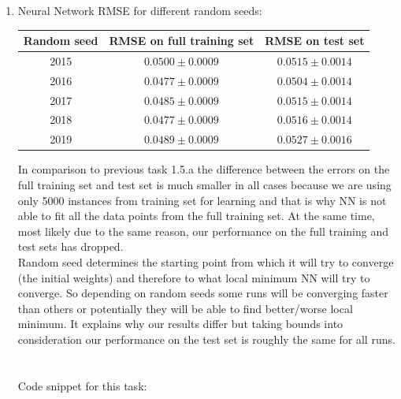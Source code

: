 \documentclass{article}
\begin{document}
\begin{enumerate}[label=(\alph*)]
				\item
					Neural Network RMSE for different random seeds:
					\begin{center}
						\begin{tabular}{| c | c | c |}
							\hline
							Random seed & RMSE on full training set & RMSE on test set\\ \hline
							2015 & $0.0500 \pm 0.0009$ & $0.0515 \pm 0.0014$ \\ 
							2016 & $0.0477 \pm 0.0009$ & $0.0504 \pm 0.0014$ \\ 
							2017 & $0.0485 \pm 0.0009$ & $0.0515 \pm 0.0014$ \\ 
							2018 & $0.0477 \pm 0.0009$ & $0.0516 \pm 0.0014$ \\ 
							2019 & $0.0489 \pm 0.0009$ & $0.0527 \pm 0.0016$ \\
							\hline
						\end{tabular}
					\end{center}
					In comparison to previous task 1.5.a the difference between the errors on the full training set and test set is much smaller in all cases because we are using only 5000 instances from training set for learning and that is why NN is not able to fit all the data points from the full training set. At the same time, most likely due to the same reason, our performance on the full training and test sets has dropped. \\
					Random seed determines the starting point from which it will try to converge (the initial weights) and therefore to what local minimum NN will try to converge. So depending on random seeds some runs will be converging faster than others or potentially they will be able to find better/worse local minimum. It explains why our results differ but taking bounds into consideration our performance on the test set is roughly the same for all runs.\\ \\ \\
					Code snippet for this task:
					
			\end{enumerate}
\end{document}
